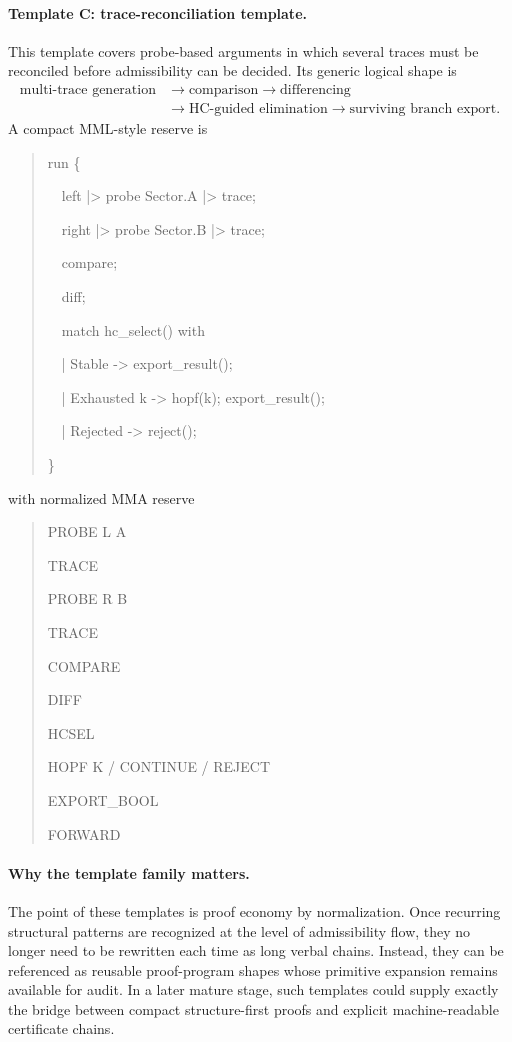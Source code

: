 \paragraph{Template C: trace-reconciliation template.}
This template covers probe-based arguments in which several traces must be reconciled before admissibility can be decided. Its generic logical shape is
\[
\begin{aligned}
\text{multi-trace generation}
&\to \text{comparison}
\to \text{differencing}\\
&\to \text{HC-guided elimination}
\to \text{surviving branch export.}
\end{aligned}
\]
A compact MML-style reserve is
\begin{quote}
\ttfamily
run \{\par
\ \ left  |> probe Sector.A |> trace;\par
\ \ right |> probe Sector.B |> trace;\par
\ \ compare;\par
\ \ diff;\par
\ \ match hc\_select() with\par
\ \ | Stable      -> export\_result();\par
\ \ | Exhausted k -> hopf(k); export\_result();\par
\ \ | Rejected    -> reject();\par
\}\par
\end{quote}
with normalized MMA reserve
\begin{quote}
\ttfamily
PROBE L A \par
TRACE \par
PROBE R B \par
TRACE \par
COMPARE \par
DIFF \par
HCSEL \par
HOPF K / CONTINUE / REJECT \par
EXPORT\_BOOL \par
FORWARD
\end{quote}

\paragraph{Why the template family matters.}
The point of these templates is proof economy by normalization. Once recurring structural patterns are recognized at the level of admissibility flow, they no longer need to be rewritten each time as long verbal chains. Instead, they can be referenced as reusable proof-program shapes whose primitive expansion remains available for audit. In a later mature stage, such templates could supply exactly the bridge between compact structure-first proofs and explicit machine-readable certificate chains.

